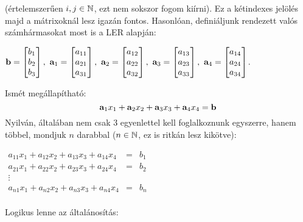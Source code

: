 \documentclass[a4paper,11.5pt]{article}
\begin{document}
	\noindent (értelemszerűen $i,j \in \mathbb{N}$, ezt nem sokszor fogom kiírni). Ez a kétindexes jelölés majd a mátrixoknál lesz igazán fontos. Hasonlóan, definiáljunk rendezett valós számhármasokat most is a LER alapján:
	\begin{center}
		$\b =
		\begin{bmatrix}
		b_{1}\s \\
		b_{2}\s \\
		b_{3}\s \\
		\end{bmatrix},~
		\a_{1} =
		\begin{bmatrix}
		a_{11}\s \\
		a_{21}\s \\
		a_{31}\s \\
		\end{bmatrix},~
		\a_{2} =
		\begin{bmatrix}
		a_{12}\s \\
		a_{22}\s \\
		a_{32}\s \\
		\end{bmatrix},~
		\a_{3} =
		\begin{bmatrix}
		a_{13}\s \\
		a_{23}\s \\
		a_{33}\s \\
		\end{bmatrix},~
		\a_{4} =
		\begin{bmatrix}
		a_{14}\s \\
		a_{24}\s \\
		a_{34}\s \\
		\end{bmatrix}$.
	\end{center}
	Ismét megállapítható:
	\[\textbf{a}_1 x_1+\textbf{a}_2 x_2+\textbf{a}_3 x_3+\textbf{a}_4 x_4=\textbf{b} \]
	Nyilván, általában nem csak 3 egyenlettel kell foglalkoznunk egyszerre, hanem többel, mondjuk $n$ darabbal ($n \in \mathbb{N}$, ez is ritkán lesz kikötve):
	\begin{center}
		$\begin{matrix}
		a_{11}x_{1} + a_{12}x_{2} + a_{13}x_{3} + a_{14}x_{4} &=& b_{1}\\
		a_{21}x_{1} + a_{22}x_{2} + a_{23}x_{3} + a_{24}x_{4} &=& b_{2}\\
		\vdots\\
		a_{n1}x_{1} + a_{n2}x_{2} + a_{n3}x_{3} + a_{n4}x_{4} &=& b_{n}\\
		\end{matrix}$
	\end{center}
	\noindent Logikus lenne az általánosítás:
\end{document}
